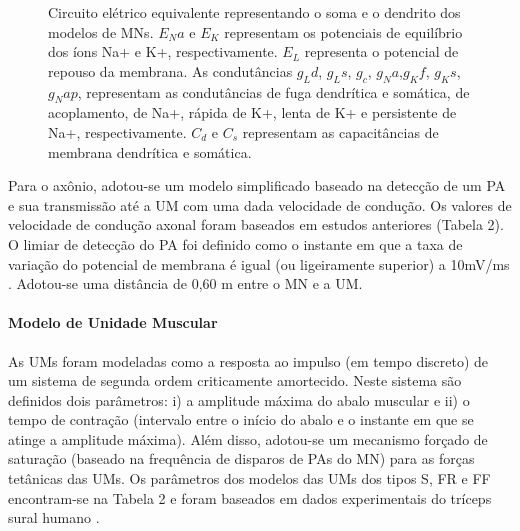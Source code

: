 \begin{figure}[h]
  \centering
  \caption{Circuito elétrico equivalente representando o soma e o dendrito dos modelos de MNs. $E_Na$ e $E_K$ representam os potenciais de equilíbrio dos íons Na+ e K+, respectivamente. $E_L$ representa o potencial de repouso da membrana. As condutâncias $g_Ld$, $g_Ls$, $g_c$, $g_Na$,$g_Kf$, $g_Ks$, $g_Nap$, representam as condutâncias de fuga dendrítica e somática, de acoplamento, de Na+, rápida de K+, lenta de K+ e persistente de Na+, respectivamente. $C_d$ e $C_s$ representam as capacitâncias de membrana dendrítica e somática.}
  \label{fig:fig1}
\end{figure}

Para o axônio, adotou-se um modelo simplificado baseado na detecção de um PA e sua transmissão até a UM com uma dada velocidade de condução. Os valores de velocidade de condução axonal foram baseados em estudos anteriores \cite{Cisi2008a} (Tabela 2). O limiar de detecção do PA foi definido como o instante em que a taxa de variação do potencial de membrana é igual (ou ligeiramente superior) a 10mV/ms \cite{Elias2012}. Adotou-se uma distância de 0,60 m entre o MN e a UM.

\paragraph{Modelo de Unidade Muscular}
As UMs foram modeladas como a resposta ao impulso (em tempo discreto) de um sistema de segunda ordem criticamente amortecido. Neste sistema são definidos dois parâmetros: i) a amplitude máxima do abalo muscular e ii) o tempo de contração (intervalo entre o início do abalo e o instante em que se atinge a amplitude máxima). Além disso, adotou-se um mecanismo forçado de saturação (baseado na frequência de disparos de PAs do MN) para as forças tetânicas das UMs. Os parâmetros dos modelos das UMs dos tipos S, FR e FF encontram-se na Tabela 2 e foram baseados em dados experimentais do tríceps sural humano \cite{Watanabe2013}.

